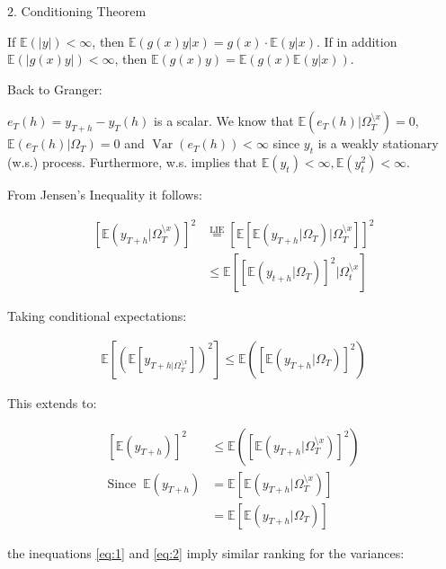 \documentclass[12pt,a4paper]{article}
\newcommand{\Var}{\operatorname{Var}} %
\begin{document}
\(2.\) Conditioning Theorem

If \(\mathbb{E}(|y|) < \infty\), then
\(\mathbb{E}(g(x) y | x) = g(x) \cdot \mathbb{E}(y|x)\). If in addition
\(\mathbb{E} (|g(x) y|) < \infty\), then
\(\mathbb{E} (g(x) y) = \mathbb{E} (g(x) \mathbb{E} (y|x))\).

Back to Granger:

\(e_T (h) = y_{T +h} - y_T (h)\) is a scalar. We know that
\(\mathbb{E} \left( e_T (h) | \Omega_T^{ \setminus x} \right) = 0\),
\(\mathbb{E} \left( e_T (h) | \Omega_T \right) = 0\) and
\(\Var(e_T (h)) < \infty\) since \(y_t\) is a weakly stationary (w.s.)
process. Furthermore, w.s. implies that
\(\mathbb{E} (y_t) < \infty, \mathbb{E} (y_t^2) < \infty\).

From Jensen's Inequality it follows:

\begin{align*}
  \left[ \mathbb{E} \left( y_{T + h} | \Omega_{T}^{\setminus x } \right) \right]^2 & \overset{\text{LIE}}{=} \left[ \mathbb{E} \left[ \mathbb{E} \left( y_{T + h} | \Omega_{T} \right) | \Omega_T^{\setminus x} \right] \right]^2 \\
  & \leq \mathbb{E} \left[ \left[ \mathbb{E} (y_{t +h} | \Omega_T)\right]^2 | \Omega_{t}^{\setminus x} \right]
\end{align*}

Taking conditional expectations:

\begin{align}
  \mathbb{E} \left[ \left( \mathbb{E}\left[ y_{T + h | \Omega_{T}^{\setminus x}} \right]  \right)^2 \right] \leq \mathbb{E} \left( \left[ \mathbb{E} \left( y_{T +h} | \Omega_T \right) \right]^2 \right) \label{eq:1}
\end{align}

This extends to:

\begin{align}
  \left[ \mathbb{E} (y_{T + h}) \right]^2 & \leq \mathbb{E}  \left( \left[ \mathbb{E} \left( y_{T + h} | \Omega_T^{\setminus x} \right) \right]^2 \right) \label{eq:2}\\
  \text{Since} \; \; \mathbb{E} (y_{T + h}) & = \mathbb{E} \left[ \mathbb{E} \left( y_{T +h} | \Omega_{T}^{\setminus x}\right) \right] \nonumber \\
  & = \mathbb{E} \left[ \mathbb{E} \left( y_{T +h} | \Omega_{T}\right) \right] \nonumber
\end{align}

the inequations \eqref{eq:1} and \eqref{eq:2} imply similar ranking for
the variances:
\end{document}
